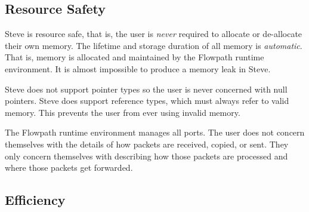 %
%
%









\subsection{Resource Safety}

Steve is resource safe, that is, the user is \emph{never} required to allocate
or de-allocate their own memory. The lifetime and storage duration of all memory
is \textit{automatic}. That is, memory is allocated and maintained by the
Flowpath runtime environment. It is almost impossible to produce a memory leak
in Steve.

Steve does not support pointer types so the user is never concerned with null
pointers. Steve does support reference types, which must always refer to valid
memory. This prevents the user from ever using invalid memory.

The Flowpath runtime environment manages all ports. The user does not concern
themselves with the details of how packets are received, copied, or sent. They
only concern themselves with describing how those packets are processed and
where those packets get forwarded.

\subsection{Efficiency}

